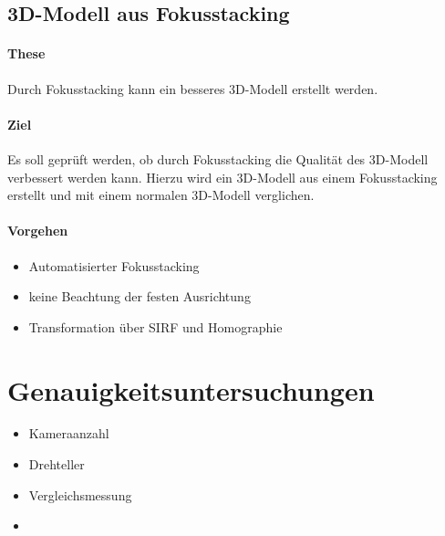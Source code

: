 \documentclass[./00PhotoBox.tex]{subfiles}
\begin{document}
\subsection{3D-Modell aus Fokusstacking}

\paragraph{These}
Durch Fokusstacking kann ein besseres 3D-Modell erstellt werden.

\paragraph{Ziel}
Es soll geprüft werden, ob durch Fokusstacking die Qualität des 3D-Modell verbessert werden kann. Hierzu wird ein 3D-Modell aus einem Fokusstacking erstellt und mit einem normalen 3D-Modell verglichen.

\paragraph{Vorgehen}
\begin{itemize}
    \item Automatisierter Fokusstacking
    \item keine Beachtung der festen Ausrichtung
    \item Transformation über SIRF und Homographie
\end{itemize}

\section{Genauigkeitsuntersuchungen}
\begin{itemize}
    \item Kameraanzahl
    \item Drehteller
    \item Vergleichsmessung
    \item
\end{itemize}

\biblio
\end{document}
